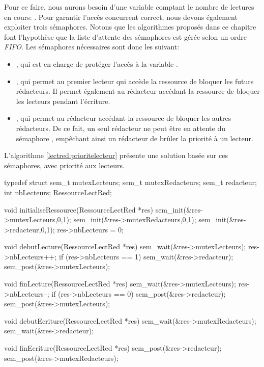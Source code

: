 Pour ce faire, nous aurons besoin d'une variable comptant le nombre de lectures en cours: . Pour garantir l'accès concurrent correct, nous devons également exploiter trois sémaphores. Notons que les algorithmes proposés dans ce chapitre font l'hypothèse que la liste d'attente des sémaphores est gérée selon un ordre \textit{FIFO}. Les sémaphores nécessaires sont donc les suivant:

\begin{itemize}
  \item {}, qui est en charge de protéger l'accès à la variable .
  \item {}, qui permet au premier lecteur qui accède la ressource de bloquer les futurs rédacteurs. Il permet également au rédacteur accédant la ressource de bloquer les lecteurs pendant l'écriture.
  \item {}, qui permet au rédacteur accédant la ressource de bloquer les autres rédacteurs. De ce fait, un seul rédacteur ne peut être en attente du sémaphore , empêchant ainsi un rédacteur de brûler la priorité à un lecteur.
\end{itemize}

L'algorithme \ref{lectred:prioritelecteur} présente une solution basée sur ces sémaphores, avec priorité aux lecteurs.

\begin{codeblock}[title={Lecteurs-rédacteurs: priorité aux lecteurs},label=lectred:prioritelecteur]
  typedef struct {
      sem_t mutexLecteurs;
      sem_t mutexRedacteurs;
      sem_t redacteur;
      int nbLecteurs;
    } RessourceLectRed;

  void initialiseRessource(RessourceLectRed *res) {
      sem_init(&res->mutexLecteurs,0,1);
      sem_init(&res->mutexRedacteurs,0,1);
      sem_init(&res->redacteur,0,1);
      res->nbLecteurs = 0;
    }

  void debutLecture(RessourceLectRed *res) {
      sem_wait(&res->mutexLecteurs);
      res->nbLecteurs++;
      if (res->nbLecteurs == 1)
      sem_wait(&res->redacteur);
      sem_post(&res->mutexLecteurs);
    }

  void finLecture(RessourceLectRed *res) {
      sem_wait(&res->mutexLecteurs);
      res->nbLecteurs--;
      if (res->nbLecteurs == 0)
      sem_post(&res->redacteur);
      sem_post(&res->mutexLecteurs);
    }

  void debutEcriture(RessourceLectRed *res) {
      sem_wait(&res->mutexRedacteurs);
      sem_wait(&res->redacteur);
    }

  void finEcriture(RessourceLectRed *res) {
      sem_post(&res->redacteur);
      sem_post(&res->mutexRedacteurs);
    }
\end{codeblock}

